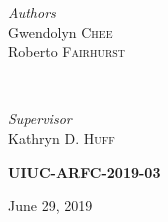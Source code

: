 \documentclass[11pt]{article}
\begin{document}
\begin{titlepage}
\begin{minipage}{0.6\textwidth}
        \end{minipage}

    \vspace{0.2cm}
    \HRule
    \vspace{0.5cm}


    \begin{minipage}{0.4\textwidth}
        \begin{flushleft}
            \large
            \textit{Authors}\\
                Gwendolyn \textsc{Chee}\\
                Roberto \textsc{Fairhurst}\\
        \end{flushleft}
    \end{minipage}
    ~
    \begin{minipage}{0.4\textwidth}
        \begin{flushright}
            \large
            \textit{Supervisor}\\
            Kathryn D. \textsc{Huff} %
        \end{flushright}
    \end{minipage}


    \vspace{1cm}
    \textsc{\LARGE\bfseries UIUC-ARFC-2019-03} %
    \vspace{0.5cm}


    \vspace{0.5cm} %
    {\large June 29, 2019} %
    \vspace{0.5cm}



\end{titlepage}
\end{document}
